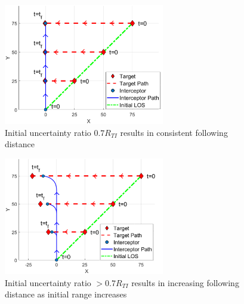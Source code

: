 \documentclass[conference]{IEEEtran}
\providecommand{\DIFaddbeginFL}{} %
\providecommand{\DIFaddendFL}{} %
\providecommand{\DIFdelbeginFL}{} %
\providecommand{\DIFdelendFL}{} %
\newcommand{\DIFscaledelfig}{0.5}
\newlength{\DIFdelgraphicswidth} %
\newlength{\DIFdelgraphicsheight} %
\newcommand{\DIFaddincludegraphics}[2][]{{\color{blue}\fbox{\DIFOincludegraphics[#1]{#2}}}} %
\newcommand{\DIFdelincludegraphics}[2][]{%
\sbox{\DIFdelgraphicsbox}{\DIFOincludegraphics[#1]{#2}}%
\settoboxwidth{\DIFdelgraphicswidth}{\DIFdelgraphicsbox} %
\settoboxtotalheight{\DIFdelgraphicsheight}{\DIFdelgraphicsbox} %
\scalebox{\DIFscaledelfig}{%
\parbox[b]{\DIFdelgraphicswidth}{\usebox{\DIFdelgraphicsbox}\\[-\baselineskip] \rule{\DIFdelgraphicswidth}{0em}}\llap{\resizebox{\DIFdelgraphicswidth}{\DIFdelgraphicsheight}{%
\setlength{\unitlength}{\DIFdelgraphicswidth}%
\begin{picture}(1,1)%
\thicklines\linethickness{2pt} %
{\color[rgb]{1,0,0}\put(0,0){\framebox(1,1){}}}%
{\color[rgb]{1,0,0}\put(0,0){\line( 1,1){1}}}%
{\color[rgb]{1,0,0}\put(0,1){\line(1,-1){1}}}%
\end{picture}%
}\hspace*{3pt}}} %
} %
\DeclareRobustCommand{\DIFaddbeginFL}{\DIFOaddbeginFL \let\includegraphics\DIFaddincludegraphics} %
\DeclareRobustCommand{\DIFaddendFL}{\DIFOaddendFL \let\includegraphics\DIFOincludegraphics} %
\DeclareRobustCommand{\DIFdelbeginFL}{\DIFOdelbeginFL \let\includegraphics\DIFdelincludegraphics} %
\DeclareRobustCommand{\DIFdelendFL}{\DIFOaddendFL \let\includegraphics\DIFOincludegraphics} %
\begin{document}
\begin{figure}[H]
	\centering
	\DIFdelbeginFL %
\DIFdelendFL \DIFaddbeginFL \includegraphics[width=7cm]{Rinit07new.png}
	\DIFaddendFL \caption{Initial uncertainty ratio $0.7R_{TI}$ results in consistent following distance}
	\label{fig:rti07}
\end{figure}

\begin{figure}[H]
	\centering
	\DIFdelbeginFL %
\DIFdelendFL \DIFaddbeginFL \includegraphics[width=7cm]{rinit08new.png}
	\DIFaddendFL \caption{Initial uncertainty ratio $>0.7R_{TI}$ results in increasing following distance as initial range increases}
	\label{fig:rti08}
\end{figure}



\end{document}
